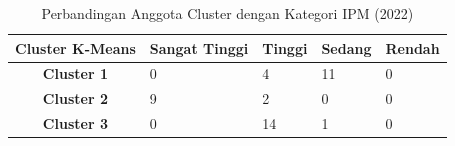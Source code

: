 \begin{table}[H]
\centering
\caption{Perbandingan Anggota Cluster dengan Kategori IPM (2022)} \label{tab:ipm_cross_2022}
\begin{tabular}{|c|p{2cm}|p{2cm}|p{2cm}|p{2cm}|}
\hline
\textbf{Cluster K-Means} & \textbf{Sangat Tinggi} & \textbf{Tinggi} & \textbf{Sedang} & \textbf{Rendah} \\ \hline
\textbf{Cluster 1} & 0 & 4 & 11 & 0 \\ \hline
\textbf{Cluster 2} & 9 & 2 & 0 & 0 \\ \hline
\textbf{Cluster 3} & 0 & 14 & 1 & 0 \\ \hline
\end{tabular}
\end{table}